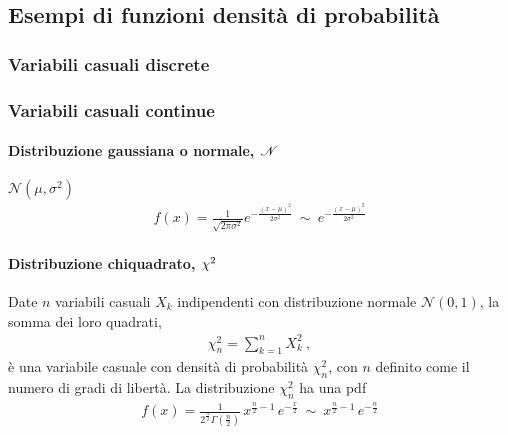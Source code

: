 \documentclass[letterpaper,10pt,italian]{jupyterBook}
\begin{document}
\subsection{Esempi di funzioni densità di probabilità}
\label{\detokenize{ch/statistics/rv_pdf_examples:esempi-di-funzioni-densita-di-probabilita}}\label{\detokenize{ch/statistics/rv_pdf_examples::doc}}

\subsubsection{Variabili casuali discrete}
\label{\detokenize{ch/statistics/rv_pdf_examples:variabili-casuali-discrete}}

\subsubsection{Variabili casuali continue}
\label{\detokenize{ch/statistics/rv_pdf_examples:variabili-casuali-continue}}

\paragraph{Distribuzione gaussiana o normale, \protect\(\mathscr{N}\protect\)}
\label{\detokenize{ch/statistics/rv_pdf_examples:distribuzione-gaussiana-o-normale-mathscr-n}}
\sphinxAtStartPar
\(\mathscr{N}(\mu, \sigma^2)\)
\begin{equation*}
\begin{split}f(x) = \frac{1}{\sqrt{2\pi\sigma^2}} e^{-\frac{(x-\mu)^2}{2\sigma^2}} \ \sim \ e^{-\frac{(x-\mu)^2}{2\sigma^2}}\end{split}
\end{equation*}

\paragraph{Distribuzione chi\sphinxhyphen{}quadrato, \protect\(\chi^2\protect\)}
\label{\detokenize{ch/statistics/rv_pdf_examples:distribuzione-chi-quadrato-chi-2}}
\sphinxAtStartPar
Date \(n\) variabili casuali \(X_k\) indipendenti con distribuzione normale \(\mathscr{N}(0,1)\), la somma dei loro quadrati,
\begin{equation*}
\begin{split}\chi_n^2 = \sum_{k=1}^{n} X^2_k \ ,\end{split}
\end{equation*}
\sphinxAtStartPar
è una variabile casuale con densità di probabilità \(\chi^2_n\), con \(n\) definito come il numero di gradi di libertà. La distribuzione \(\chi^2_n\) ha una pdf
\begin{equation*}
\begin{split}f(x) = \frac{1}{2^{\frac{n}{2}} \Gamma\left(\frac{n}{2}\right)} \, x^{\frac{n}{2}-1} \, e^{-\frac{x}{2}} \ \sim \ x^{\frac{n}{2}-1} \, e^{-\frac{n}{2}}\end{split}
\end{equation*}
\end{document}
